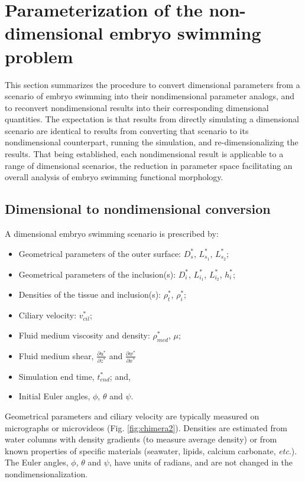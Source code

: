\documentclass[10pt,a4paper]{article}
\def\p{\partial}
\def\etc{\emph{etc}.\xspace}
\begin{document}
\section{Parameterization of the non-dimensional embryo swimming problem}\label{NDparsSect}
This section summarizes the procedure to convert dimensional parameters from a scenario of embryo swimming into their nondimensional parameter analogs, and to reconvert nondimensional results into their corresponding dimensional quantities.
The expectation is that results from directly simulating a dimensional scenario are identical to results from converting that scenario to its nondimensional counterpart, running the simulation, and re-dimensionalizing the results.
That being established, each nondimensional result is applicable to a range of dimensional scenarios, the reduction in parameter space facilitating an overall analysis of embryo swimming functional morphology.

\subsection{Dimensional to nondimensional conversion}
A dimensional embryo swimming scenario is prescribed by:
\begin{itemize}
	\item Geometrical parameters of the outer surface: $D^*_s$, $L^*_{s_1}$, $L^*_{s_2}$; 
	\item Geometrical parameters of the inclusion(s): $D^*_{i}$, $L^*_{i_1}$, $L^*_{i_2}$, $h^*_i$; 
	\item Densities of the tissue and inclusion(s): $\rho^*_t$, $\rho^*_{i}$; 
	\item Ciliary velocity: $v^*_{cil}$;
	\item Fluid medium viscosity and density: $\rho^*_{med}$, $\mu$;
	\item Fluid medium shear, $\frac{\p u^*}{\p z^*}$ and $\frac{\p w^*}{\p x^*}$
	\item Simulation end time, $t^*_{end}$; and,
	\item Initial Euler angles, $\phi$, $\theta$ and $\psi$. 
\end{itemize}
Geometrical parameters and ciliary velocity are typically measured on micrographs or microvideos (Fig. \ref{fig:chimera2}).
Densities are estimated from water columns with density gradients (to measure average density) or from known properties of specific materials (seawater, lipids, calcium carbonate, \etc). 
The Euler angles, $\phi$, $\theta$ and $\psi$,  have units of radians, and are not changed in the nondimensionalization.
\end{document}
